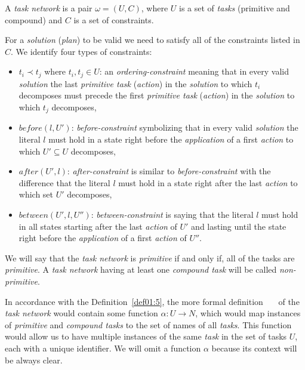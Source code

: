 \begin{defn}\label{def02:9}
    A \emph{task network} is a pair $\omega = (U,C)$, where $U$ is a set of \emph{tasks} (primitive and compound) and $C$ is a set of constraints.
    
    For a \emph{solution} (\emph{plan}) to be valid we need to satisfy all of the constraints listed in $C$. We identify four types of constraints:

    \begin{itemize}
        \item $t_i \prec t_j$ where $t_i,t_j \in U$: an \emph{ordering-constraint} meaning that in every valid \emph{solution} the last \emph{primitive task} (\emph{action}) in the \emph{solution} to which $t_i$ decomposes must precede the first \emph{primitive task} (\emph{action}) in the \emph{solution} to which $t_j$ decomposes,
        
        \item $before(l,U')$: \emph{before-constraint} symbolizing that in every valid \emph{solution} the literal $l$ must hold in a state right before the \emph{application} of a first \emph{action} to which $U' \subseteq U$ decomposes,
    
        \item $after(U',l)$: \emph{after-constraint} is similar to \emph{before-constraint} with the difference that the literal $l$ must hold in a state right after the last \emph{action} to which set $U'$ decomposes,
    
        \item $between(U',l,U'')$: \emph{between-constraint} is saying that the literal $l$ must hold in all states starting after the last \emph{action} of $U'$ and lasting until the state right before the \emph{application} of a first \emph{action} of $U''$.
    \end{itemize}

    We will say that the \emph{task network} is \emph{primitive} if and only if, all of the tasks are \emph{primitive}. A \emph{task network} having at least one \emph{compound task} will be called \emph{non-primitive}.
\end{defn}

\medskip\noindent
In accordance with the Definition~\ref{def01:5}, the more formal definition~\cite{complexity}~\cite{langclassification}~\cite{nau} of the \emph{task network} would contain some function $\alpha: U \rightarrow N$, which would map instances of \emph{primitive} and \emph{compound tasks} to the set of names of all \emph{tasks}. This function would allow us to have multiple instances of the same \emph{task} in the set of tasks $U$, each with a unique identifier. We will omit a function $\alpha$ because its context will be always clear.

